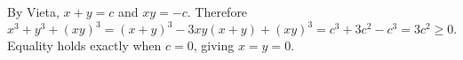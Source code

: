 By Vieta, $x+y=c$ and $xy=-c$. Therefore
\[
x^3+y^3+(xy)^3=(x+y)^3-3xy(x+y)+(xy)^3
=c^3+3c^2-c^3=3c^2\ge0.
\]
Equality holds exactly when $c=0$, giving $x=y=0$.
